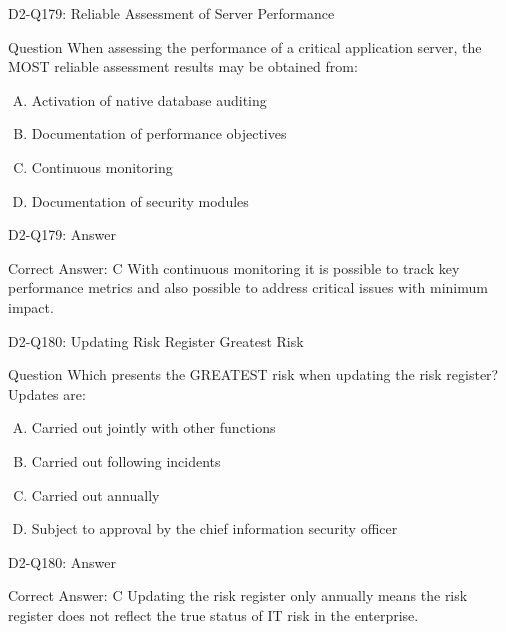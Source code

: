 \documentclass{beamer}
\begin{document}
	\begin{frame}{D2-Q179: Reliable Assessment of Server Performance}
		\begin{block}{Question}
			When assessing the performance of a critical application server, the MOST reliable assessment results may be obtained from:
		\end{block}
		\begin{enumerate}[(A)]
			\item Activation of native database auditing
			\item Documentation of performance objectives
			\item Continuous monitoring
			\item Documentation of security modules
		\end{enumerate}
	\end{frame}
	\begin{frame}{D2-Q179: Answer}
		\begin{block}{Correct Answer: C}
			With continuous monitoring it is possible to track key performance metrics and also possible to address critical issues with minimum impact.
		\end{block}
	\end{frame}
	
	\begin{frame}{D2-Q180: Updating Risk Register Greatest Risk}
		\begin{block}{Question}
			Which presents the GREATEST risk when updating the risk register? Updates are:
		\end{block}
		\begin{enumerate}[(A)]
			\item Carried out jointly with other functions
			\item Carried out following incidents
			\item Carried out annually
			\item Subject to approval by the chief information security officer
		\end{enumerate}
	\end{frame}
	\begin{frame}{D2-Q180: Answer}
		\begin{block}{Correct Answer: C}
			Updating the risk register only annually means the risk register does not reflect the true status of IT risk in the enterprise.
		\end{block}
	\end{frame}
	
\end{document}
